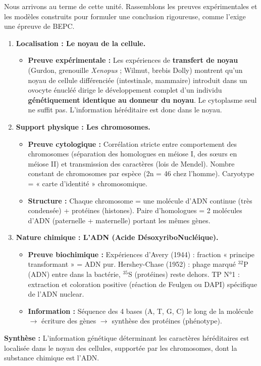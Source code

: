 \documentclass[11pt]{article}
\newcommand{\cle}[1]{{\popxbold\color{popdark}#1}}
\begin{document}
Nous arrivons au terme de cette unité. Rassemblons les preuves expérimentales et les modèles construits pour formuler une conclusion rigoureuse, comme l'exige une épreuve de BEPC.

\begin{aretenir}
\begin{enumerate}
    \item \textbf{Localisation : Le noyau de la cellule.}
    \begin{itemize}
        \item \textbf{Preuve expérimentale :} Les expériences de \textbf{transfert de noyau} (Gurdon, grenouille \emph{Xenopus} ; Wilmut, brebis Dolly) montrent qu'un noyau de cellule différenciée (intestinale, mammaire) introduit dans un ovocyte énucléé dirige le développement complet d'un individu \textbf{génétiquement identique au donneur du noyau}. Le cytoplasme seul ne suffit pas. L'information héréditaire est donc dans le noyau.
    \end{itemize}
    \item \textbf{Support physique : Les chromosomes.}
    \begin{itemize}
        \item \textbf{Preuve cytologique :} Corrélation stricte entre comportement des chromosomes (séparation des homologues en méiose I, des sœurs en méiose II) et transmission des caractères (lois de Mendel). Nombre constant de chromosomes par espèce (2n = 46 chez l'homme). Caryotype = « carte d'identité » chromosomique.
        \item \textbf{Structure :} Chaque chromosome = une molécule d'ADN continue (très condensée) + protéines (histones). Paire d'homologues = 2 molécules d'ADN (paternelle + maternelle) portant les mêmes gènes.
    \end{itemize}
    \item \textbf{Nature chimique : L'ADN (Acide DésoxyriboNucléique).}
    \begin{itemize}
        \item \textbf{Preuve biochimique :} Expériences d'Avery (1944) : fraction « principe transformant » = ADN pur. Hershey-Chase (1952) : phage marqué $^{32}$P (ADN) entre dans la bactérie, $^{35}$S (protéines) reste dehors. TP N°1 : extraction et coloration positive (réaction de Feulgen ou DAPI) spécifique de l'ADN nuclear.
        \item \textbf{Information :} Séquence des 4 bases (A, T, G, C) le long de la molécule $\rightarrow$ écriture des gènes $\rightarrow$ synthèse des protéines (phénotype).
    \end{itemize}
\end{enumerate}
\textbf{Synthèse :} \cle{L'information génétique déterminant les caractères héréditaires est localisée dans le noyau des cellules, supportée par les chromosomes, dont la substance chimique est l'ADN.}
\end{aretenir}
\end{document}
